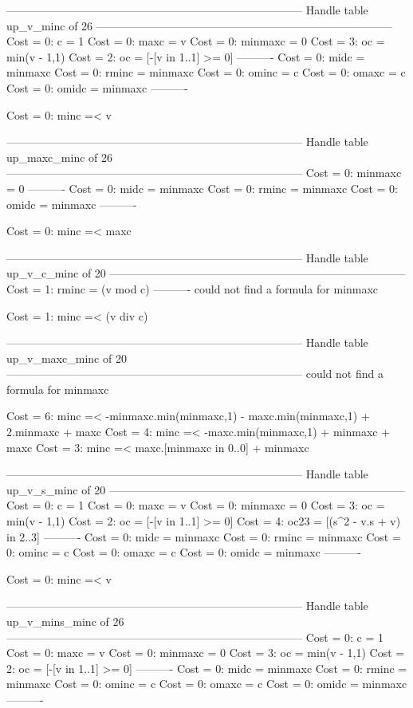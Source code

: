 --------------------------------------------------------------------------------
Handle table up_v_minc of 26
--------------------------------------------------------------------------------
Cost =  0:  c       = 1
Cost =  0:  maxc    = v
Cost =  0:  minmaxc = 0
Cost =  3:  oc      = min(v - 1,1)
Cost =  2:  oc      = [-[v in 1..1] >= 0]
----------
Cost =  0:  midc    = minmaxc
Cost =  0:  rminc   = minmaxc
Cost =  0:  ominc   = c
Cost =  0:  omaxc   = c
Cost =  0:  omidc   = minmaxc
----------

Cost =  0:  minc =< v

--------------------------------------------------------------------------------
Handle table up_maxc_minc of 26
--------------------------------------------------------------------------------
Cost =  0:  minmaxc = 0
----------
Cost =  0:  midc    = minmaxc
Cost =  0:  rminc   = minmaxc
Cost =  0:  omidc   = minmaxc
----------

Cost =  0:  minc =< maxc

--------------------------------------------------------------------------------
Handle table up_v_c_minc of 20
--------------------------------------------------------------------------------
Cost =  1:  rminc   = (v mod c)
----------
could not find a formula for minmaxc

Cost =  1:  minc =< (v div c)

--------------------------------------------------------------------------------
Handle table up_v_maxc_minc of 20
--------------------------------------------------------------------------------
could not find a formula for minmaxc

Cost =  6:  minc =< -minmaxc.min(minmaxc,1) - maxc.min(minmaxc,1) + 2.minmaxc + maxc
Cost =  4:  minc =< -maxc.min(minmaxc,1) + minmaxc + maxc
Cost =  3:  minc =< maxc.[minmaxc in 0..0] + minmaxc

--------------------------------------------------------------------------------
Handle table up_v_s_minc of 20
--------------------------------------------------------------------------------
Cost =  0:  c       = 1
Cost =  0:  maxc    = v
Cost =  0:  minmaxc = 0
Cost =  3:  oc      = min(v - 1,1)
Cost =  2:  oc      = [-[v in 1..1] >= 0]
Cost =  4:  oc23    = [(s^2 - v.s + v) in 2..3]
----------
Cost =  0:  midc    = minmaxc
Cost =  0:  rminc   = minmaxc
Cost =  0:  ominc   = c
Cost =  0:  omaxc   = c
Cost =  0:  omidc   = minmaxc
----------

Cost =  0:  minc =< v

--------------------------------------------------------------------------------
Handle table up_v_mins_minc of 26
--------------------------------------------------------------------------------
Cost =  0:  c       = 1
Cost =  0:  maxc    = v
Cost =  0:  minmaxc = 0
Cost =  3:  oc      = min(v - 1,1)
Cost =  2:  oc      = [-[v in 1..1] >= 0]
----------
Cost =  0:  midc    = minmaxc
Cost =  0:  rminc   = minmaxc
Cost =  0:  ominc   = c
Cost =  0:  omaxc   = c
Cost =  0:  omidc   = minmaxc
----------

